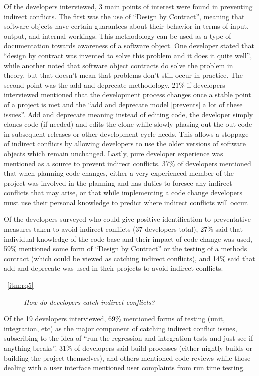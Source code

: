 \documentclass[conference]{IEEEtran}
\begin{document}
Of the developers interviewed, 3 main points of interest were found in preventing indirect conflicts. The first was
the use of ``Design by Contract''\texttrademark, meaning that software objects have certain guarantees about their behavior
in terms of input, output, and internal workings. This methodology can be used as a type of documentation towards awareness of
a software object. One developer stated that ``design by contract was invented to solve this problem and it does it quite well'', 
while another noted that software  object contracts do solve the problem in theory, but that doesn't mean that problems don't 
still occur in practice. The second point was the add and deprecate methodology. 21\% if developers interviewed mentioned 
that the development process changes once a stable point of a project is met and the ``add and deprecate model [prevents] a lot 
of these issues''. Add and deprecate meaning instead of editing code, the developer simply clones code (if needed) and edits the clone
while slowly phasing out the out code in subsequent releases or other development cycle needs. This allows a stoppage of indirect conflicts
by allowing developers to use the older versions of software objects which remain unchanged. Lastly, pure developer experience was mentioned
as a source to prevent indirect conflicts. 37\% of developers mentioned that when planning code changes, either a very experienced member
of the project was involved in the planning and has duties to foresee any indirect conflicts that may arise, or that while implementing
a code change developers must use their personal knowledge to predict where indirect conflicts will occur. 

Of the developers surveyed who could give positive identification to preventative measures taken to avoid indirect conflicts (37 developers
total), 27\% said that individual knowledge of the code base and their impact of code change was used, 59\% mentioned some form of ``Design
by Contract'' or the testing of a methods contract (which could be viewed as catching indirect conflicts), and 14\% said that add and
deprecate was used in their projects to avoid indirect conflicts.

\begin{description}
	\item[~\ref{itm:rq5}] \textit{How do developers catch indirect conflicts?}
\end{description}

Of the 19 developers interviewed, 69\% mentioned forms of testing (unit, integration, etc) as the major component of catching indirect
conflict issues, subscribing to the idea of ``run the regression and integration tests and just see if anything breaks''. 31\% of developers 
said build processes (either nightly builds or building the project themselves), and others mentioned code reviews
while those dealing with a user interface mentioned user complaints from run time testing.
\end{document}
